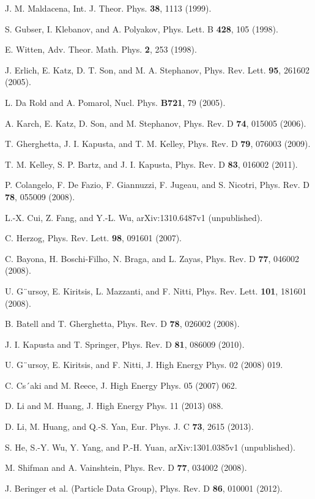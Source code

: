 \documentclass[aps,prd,12pt,nofootinbib]{revtex4}
\begin{document}
\begin{thebibliography}{99}

 J. M. Maldacena, Int. J. Theor. Phys. {\bf 38}, 1113 (1999).

 S. Gubser, I. Klebanov, and A. Polyakov, Phys. Lett. B {\bf 428}, 105 (1998).

 E. Witten, Adv. Theor. Math. Phys. {\bf 2}, 253 (1998).

 J. Erlich, E. Katz, D. T. Son, and M. A. Stephanov, Phys. Rev. Lett. {\bf 95}, 261602 (2005).

 L. Da Rold and A. Pomarol, Nucl. Phys. {\bf B721}, 79 (2005).

 A. Karch, E. Katz, D. Son, and M. Stephanov, Phys. Rev. D {\bf 74}, 015005 (2006).

 T. Gherghetta, J. I. Kapusta, and T. M. Kelley, Phys. Rev. D {\bf 79}, 076003 (2009).

 T. M. Kelley, S. P. Bartz, and J. I. Kapusta, Phys. Rev. D {\bf 83}, 016002 (2011).

 P. Colangelo, F. De Fazio, F. Giannuzzi, F. Jugeau, and S. Nicotri, Phys. Rev. D {\bf 78}, 055009 (2008).

 L.-X. Cui, Z. Fang, and Y.-L. Wu, arXiv:1310.6487v1 (unpublished).

 C. Herzog, Phys. Rev. Lett. {\bf 98}, 091601 (2007).

 C. Bayona, H. Boschi-Filho, N. Braga, and L. Zayas, Phys. Rev. D {\bf 77}, 046002 (2008).

 U. G¨ursoy, E. Kiritsis, L. Mazzanti, and F. Nitti, Phys. Rev. Lett. {\bf 101}, 181601 (2008).

 B. Batell and T. Gherghetta, Phys. Rev. D {\bf 78}, 026002 (2008).

 J. I. Kapusta and T. Springer, Phys. Rev. D {\bf 81}, 086009 (2010).

 U. G¨ursoy, E. Kiritsis, and F. Nitti, J. High Energy Phys. 02 (2008) 019.

 C. Cs´aki and M. Reece, J. High Energy Phys. 05 (2007) 062.

 D. Li and M. Huang, J. High Energy Phys. 11 (2013) 088.

 D. Li, M. Huang, and Q.-S. Yan, Eur. Phys. J. C {\bf 73}, 2615 (2013).

 S. He, S.-Y. Wu, Y. Yang, and P.-H. Yuan, arXiv:1301.0385v1 (unpublished).

 M. Shifman and A. Vainshtein, Phys. Rev. D {\bf 77}, 034002 (2008).

 J. Beringer et al. (Particle Data Group), Phys. Rev. D {\bf 86}, 010001 (2012).

\end{thebibliography}
\end{document}
